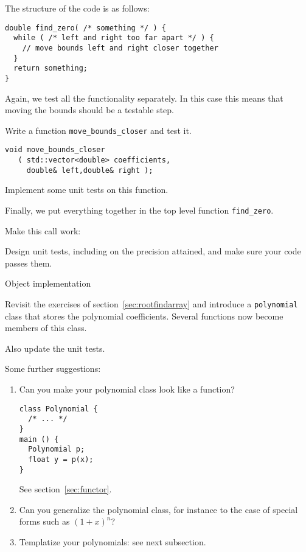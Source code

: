 The structure of the code is as follows:
\begin{lstlisting}
double find_zero( /* something */ ) {
  while ( /* left and right too far apart */ ) {
    // move bounds left and right closer together
  }
  return something;
}
\end{lstlisting}

Again, we test all the functionality separately.
In this case this means that moving the bounds
should be a testable step.

\begin{exercise}
  Write a function \lstinline+move_bounds_closer+
  and test it.
\begin{lstlisting}
void move_bounds_closer
   ( std::vector<double> coefficients,
     double& left,double& right );
\end{lstlisting}
  Implement some unit tests on this function.
\end{exercise}

Finally, we put everything together in the top level function \lstinline{find_zero}.

\begin{exercise}
  \label{ex:bisect-find}
  Make this call work:

  Design unit tests, including on the precision attained,
  and make sure your code passes them.
\end{exercise}

 {Object implementation}
\label{sec:rootfindclass}

Revisit the exercises of section~\ref{sec:rootfindarray}
and introduce a \lstinline{polynomial} class
that stores the polynomial coefficients.
Several functions now become members of this class.

Also update the unit tests.

Some further suggestions:
\begin{enumerate}
\item
  Can you make your polynomial class look like a function?
\begin{lstlisting}
class Polynomial {
  /* ... */
}
main () {
  Polynomial p;
  float y = p(x);
}
\end{lstlisting}
  See section~\ref{sec:functor}.
\item 
  Can you generalize the polynomial class, for instance
  to the case of special forms such as $(1+x)^n$?
\item
  Templatize your polynomials: see next subsection.
\end{enumerate}

